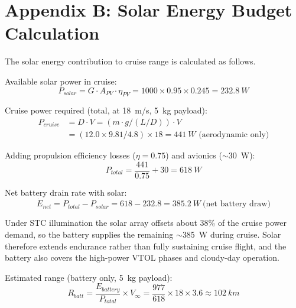 \section*{Appendix B: Solar Energy Budget Calculation}

\noindent The solar energy contribution to cruise range is calculated as follows.

\noindent Available solar power in cruise:
\begin{equation}
    P_{solar} = G \cdot A_{PV} \cdot \eta_{PV} = 1000 \times 0.95 \times 0.245 = \SI{232.8}{W}
\end{equation}

\noindent Cruise power required (total, at 18~m/s, 5~kg payload):
\begin{equation}
\begin{aligned}
    P_{cruise} &= D \cdot V = (m \cdot g / (L/D)) \cdot V \\
               &= (12.0 \times 9.81 / 4.8) \times 18 = \SI{441}{W} \text{ (aerodynamic only)}
\end{aligned}
\end{equation}

\noindent Adding propulsion efficiency losses ($\eta = 0.75$) and avionics ($\sim$30~W):
\begin{equation}
    P_{total} = \frac{441}{0.75} + 30 = \SI{618}{W}
\end{equation}

\noindent Net battery drain rate with solar:
\begin{equation}
    \dot{E}_{net} = P_{total} - P_{solar} = 618 - 232.8 = \SI{385.2}{W}\ \text{(net battery draw)}
\end{equation}

\noindent Under STC illumination the solar array offsets about 38\% of the cruise power demand, so the battery supplies the remaining $\sim$\SI{385}{W} during cruise. Solar therefore extends endurance rather than fully sustaining cruise flight, and the battery also covers the high-power VTOL phases and cloudy-day operation.

\noindent Estimated range (battery only, 5~kg payload):
\begin{equation}
    R_{batt} = \frac{E_{battery}}{P_{total}} \times V_\infty = \frac{977}{618} \times 18 \times 3.6 \approx \SI{102}{km}
\end{equation}


